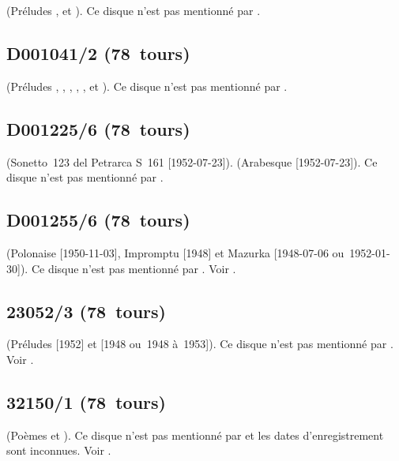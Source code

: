 \Chopin{} (Préludes  ,   et
 ).
Ce disque n'est pas mentionné par \INikonovich{}
\citep[voir][]{Nikonovich11}.

\subsection{D001041/2 (78~tours)}

\Chopin{} (Préludes  ,  , 
,  ,  , 
 et  ).
Ce disque n'est pas mentionné par \INikonovich{}
\citep[voir][]{Nikonovich11}.

\subsection{D001225/6 (78~tours)}

\Liszt{} (Sonetto~123 del Petrarca S~161  [1952-07-23]).
\Schumann{} (Arabesque  [1952-07-23]).
Ce disque n'est pas mentionné par \INikonovich{}
\citep[voir][]{Nikonovich11}.

\subsection{D001255/6 (78~tours)}

\Scriabine{} (Polonaise  [1950-11-03], Impromptu 
 [1948] et Mazurka   [1948-07-06
ou~1952-01-30]).
Ce disque n'est pas mentionné par \INikonovich{}
\citep[voir][]{Nikonovich11}.
Voir \citet{Recordssu}.

\subsection{23052/3 (78~tours)}

\Scriabine{} (Préludes   [1952] et  
[1948 ou~1948 à~1953]).
Ce disque n'est pas mentionné par \INikonovich{}
\citep[voir][]{Nikonovich11}.
Voir \citet{Recordssu}.

\subsection{32150/1 (78~tours)}

\Scriabine{} (Poèmes   et  ).
Ce disque n'est pas mentionné par \INikonovich{}
\citep[voir][]{Nikonovich11} et les dates d'enregistrement sont inconnues.
Voir \citet{Recordssu}.

